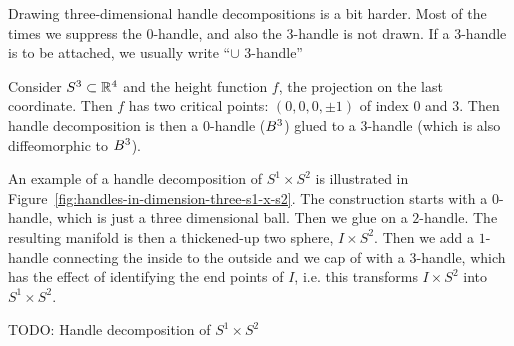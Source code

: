 Drawing three-dimensional handle decompositions is a bit harder. Most of the times we suppress the $0$-handle, and also the $3$-handle is not drawn. If a $3$-handle is to be attached, we usually write ``$\cup $ $3$-handle''

\begin{eg}
    Consider $S^{3} \subset \mathbb{R}^{4}$ and the height function $f$, the projection on the last coordinate.
    Then $f$ has two critical points: $(0, 0, 0, \pm 1)$ of index $0$ and $3$.
    Then handle decomposition is then a $0$-handle ($B^{3}$) glued to a $3$-handle (which is also diffeomorphic to $B^{3}$).
\end{eg}

\begin{eg}
    An example of a handle decomposition of $S^{1} \times S^{2}$ is illustrated in Figure~\ref{fig:handles-in-dimension-three-s1-x-s2}.
    The construction starts with a $0$-handle, which is just a three dimensional ball.
    Then we glue on a $2$-handle.
    The resulting manifold is then a thickened-up   two sphere, $I \times S^{2}$.
    Then we add a $1$-handle connecting the inside to the outside and we cap of with a $3$-handle, which has the effect of identifying the end points of $I$, i.e. this transforms  $I \times S^{2}$ into $ S^1 \times S^{2}$.
\end{eg}
\begin{marginfigure}
    \centering
    \caption{TODO: Handle decomposition of $S^{1} \times S^{2}$}
    \label{fig:handles-in-dimension-three-s1-x-s2}
\end{marginfigure}

